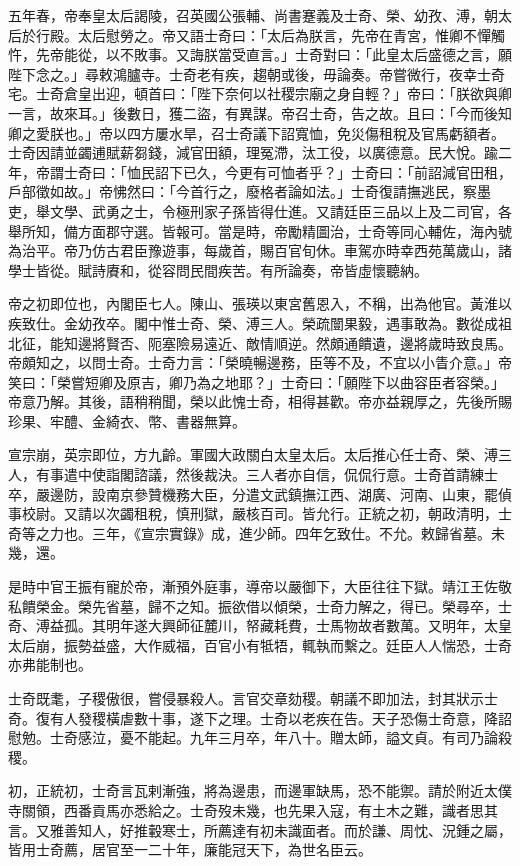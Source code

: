 \begin{pinyinscope}
五年春，帝奉皇太后謁陵，召英國公張輔、尚書蹇義及士奇、榮、幼孜、溥，朝太后於行殿。太后慰勞之。帝又語士奇曰：「太后為朕言，先帝在青宮，惟卿不憚觸忤，先帝能從，以不敗事。又誨朕當受直言。」士奇對曰：「此皇太后盛德之言，願陛下念之。」尋敕鴻臚寺。士奇老有疾，趨朝或後，毋論奏。帝嘗微行，夜幸士奇宅。士奇倉皇出迎，頓首曰：「陛下奈何以社稷宗廟之身自輕？」帝曰：「朕欲與卿一言，故來耳。」後數日，獲二盜，有異謀。帝召士奇，告之故。且曰：「今而後知卿之愛朕也。」帝以四方屢水旱，召士奇議下詔寬恤，免災傷租稅及官馬虧額者。士奇因請並蠲逋賦薪芻錢，減官田額，理冤滯，汰工役，以廣德意。民大悅。踰二年，帝謂士奇曰：「恤民詔下已久，今更有可恤者乎？」士奇曰：「前詔減官田租，戶部徵如故。」帝怫然曰：「今首行之，廢格者論如法。」士奇復請撫逃民，察墨吏，舉文學、武勇之士，令極刑家子孫皆得仕進。又請廷臣三品以上及二司官，各舉所知，備方面郡守選。皆報可。當是時，帝勵精圖治，士奇等同心輔佐，海內號為治平。帝乃仿古君臣豫遊事，每歲首，賜百官旬休。車駕亦時幸西苑萬歲山，諸學士皆從。賦詩賡和，從容問民間疾苦。有所論奏，帝皆虛懷聽納。

帝之初即位也，內閣臣七人。陳山、張瑛以東宮舊恩入，不稱，出為他官。黃淮以疾致仕。金幼孜卒。閣中惟士奇、榮、溥三人。榮疏闓果毅，遇事敢為。數從成祖北征，能知邊將賢否、阨塞險易遠近、敵情順逆。然頗通饋遺，邊將歲時致良馬。帝頗知之，以問士奇。士奇力言：「榮曉暢邊務，臣等不及，不宜以小眚介意。」帝笑曰：「榮嘗短卿及原吉，卿乃為之地耶？」士奇曰：「願陛下以曲容臣者容榮。」帝意乃解。其後，語稍稍聞，榮以此愧士奇，相得甚歡。帝亦益親厚之，先後所賜珍果、牢醴、金綺衣、幣、書器無算。

宣宗崩，英宗即位，方九齡。軍國大政關白太皇太后。太后推心任士奇、榮、溥三人，有事遣中使詣閣諮議，然後裁決。三人者亦自信，侃侃行意。士奇首請練士卒，嚴邊防，設南京參贊機務大臣，分遣文武鎮撫江西、湖廣、河南、山東，罷偵事校尉。又請以次蠲租稅，慎刑獄，嚴核百司。皆允行。正統之初，朝政清明，士奇等之力也。三年，《宣宗實錄》成，進少師。四年乞致仕。不允。敕歸省墓。未幾，還。

是時中官王振有寵於帝，漸預外庭事，導帝以嚴御下，大臣往往下獄。靖江王佐敬私饋榮金。榮先省墓，歸不之知。振欲借以傾榮，士奇力解之，得已。榮尋卒，士奇、溥益孤。其明年遂大興師征麓川，帑藏耗費，士馬物故者數萬。又明年，太皇太后崩，振勢益盛，大作威福，百官小有牴牾，輒執而繫之。廷臣人人惴恐，士奇亦弗能制也。

士奇既耄，子稷傲很，嘗侵暴殺人。言官交章劾稷。朝議不即加法，封其狀示士奇。復有人發稷橫虐數十事，遂下之理。士奇以老疾在告。天子恐傷士奇意，降詔慰勉。士奇感泣，憂不能起。九年三月卒，年八十。贈太師，謚文貞。有司乃論殺稷。

初，正統初，士奇言瓦剌漸強，將為邊患，而邊軍缺馬，恐不能禦。請於附近太僕寺關領，西番貢馬亦悉給之。士奇歿未幾，也先果入寇，有土木之難，識者思其言。又雅善知人，好推轂寒士，所薦達有初未識面者。而於謙、周忱、況鍾之屬，皆用士奇薦，居官至一二十年，廉能冠天下，為世名臣云。


\end{pinyinscope}
